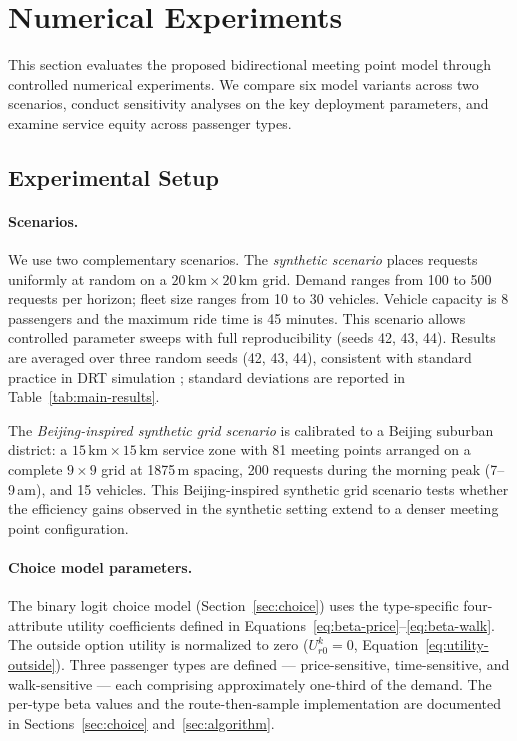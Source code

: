 \section{Numerical Experiments}\label{sec:experiments}

This section evaluates the proposed bidirectional meeting point model through
controlled numerical experiments. We compare six model variants across two
scenarios, conduct sensitivity analyses on the key deployment parameters, and
examine service equity across passenger types.

\subsection{Experimental Setup}

\paragraph{Scenarios.}
We use two complementary scenarios. The \emph{synthetic scenario} places
requests uniformly at random on a $20\,\text{km} \times 20\,\text{km}$ grid.
Demand ranges from 100 to 500 requests per horizon; fleet size ranges from 10
to 30 vehicles. Vehicle capacity is 8 passengers and the maximum ride time is
45 minutes. This scenario allows controlled parameter sweeps with full
reproducibility (seeds 42, 43, 44). Results are averaged over three random seeds (42, 43, 44), consistent with standard practice in DRT simulation \citep{wu2025}; standard deviations
are reported in Table~\ref{tab:main-results}.

The \emph{Beijing-inspired synthetic grid scenario} is calibrated to a Beijing suburban
district: a $15\,\text{km} \times 15\,\text{km}$ service zone with 81 meeting
points arranged on a complete $9 \times 9$ grid at 1875\,m spacing, 200 requests
during the morning peak (7--9\,am), and 15 vehicles. This Beijing-inspired
synthetic grid scenario tests
whether the efficiency gains observed in the synthetic setting extend to a
denser meeting point configuration.

\paragraph{Choice model parameters.}
The binary logit choice model (Section~\ref{sec:choice}) uses the type-specific
four-attribute utility coefficients defined in Equations~\ref{eq:beta-price}--\ref{eq:beta-walk}.
The outside option utility is normalized to zero ($U_{r0}^k = 0$,
Equation~\ref{eq:utility-outside}). Three passenger types are defined --- price-sensitive,
time-sensitive, and walk-sensitive --- each comprising approximately
one-third of the demand. The per-type beta values and the route-then-sample
implementation are documented in Sections~\ref{sec:choice} and~\ref{sec:algorithm}.

